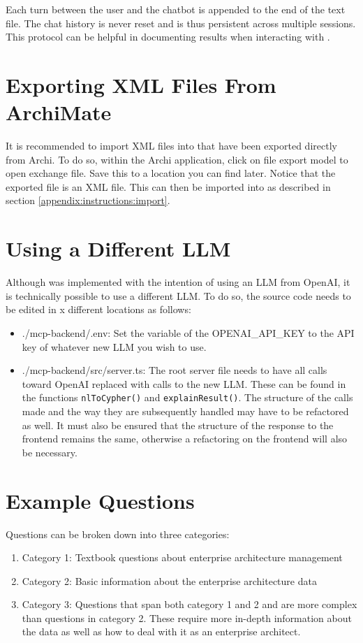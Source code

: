 Each turn between the user and the chatbot is appended to the end of the text file. The chat history is never reset and is thus persistent across multiple sessions. This protocol can be helpful in documenting results when interacting with \prototype{}.

\section{Exporting XML Files From ArchiMate}
\label{appendix:instructions:exportArchi}
It is recommended to import XML files into \prototype{} that have been exported directly from Archi. To do so, within the Archi application, click on file \textrightarrow{} export \textrightarrow{} model to open exchange file. Save this to a location you can find later. Notice that the exported file is an XML file. This can then be imported into \prototype{} as described in section \ref{appendix:instructions:import}.


\section{Using a Different LLM}
\label{appendix:instructions:llm}
Although \prototype{} was implemented with the intention of using an LLM from OpenAI, it is technically possible to use a different LLM. To do so, the source code needs to be edited in x different locations as follows:

\begin{itemize}
	\item ./mcp-backend/.env: Set the variable of the OPENAI\_API\_KEY to the API key of whatever new LLM you wish to use.
	\item ./mcp-backend/src/server.ts: The root server file needs to have all calls toward OpenAI replaced with calls to the new LLM. These can be found in the functions \texttt{nlToCypher()} and \texttt{explainResult()}. The structure of the calls made and the way they are subsequently handled may have to be refactored as well. It must also be ensured that the structure of the response to the frontend remains the same, otherwise a refactoring on the frontend will also be necessary.
\end{itemize}

\section{Example Questions}
\label{appendix:instructions:questions}
Questions can be broken down into three categories:
\begin{enumerate}
	\item Category 1: Textbook questions about enterprise architecture management
	\item Category 2: Basic information about the enterprise architecture data
	\item Category 3: Questions that span both category 1 and 2 and are more complex than questions in category 2. These require more in-depth information about the data as well as how to deal with it as an enterprise architect.
\end{enumerate}

